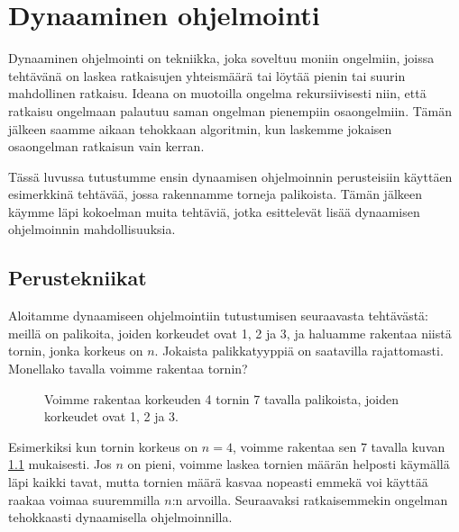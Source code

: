 \chapter{Dynaaminen ohjelmointi}


Dynaaminen ohjelmointi on tekniikka,
joka soveltuu moniin ongelmiin,
joissa tehtävänä on laskea ratkaisujen yhteismäärä
tai löytää pienin tai suurin mahdollinen ratkaisu.
Ideana on muotoilla ongelma rekursiivisesti niin,
että ratkaisu ongelmaan palautuu saman ongelman
pienempiin osaongelmiin.
Tämän jälkeen saamme aikaan tehokkaan algoritmin,
kun laskemme jokaisen osaongelman ratkaisun vain kerran.

Tässä luvussa tutustumme ensin dynaamisen ohjelmoinnin perusteisiin
käyttäen esimerkkinä tehtävää, jossa rakennamme torneja palikoista.
Tämän jälkeen käymme läpi kokoelman muita tehtäviä, jotka esittelevät
lisää dynaamisen ohjelmoinnin mahdollisuuksia.

\section{Perustekniikat}

Aloitamme dynaamiseen ohjelmointiin tutustumisen
seuraavasta tehtävästä:
meillä on palikoita, joiden korkeudet ovat 1, 2 ja 3,
ja haluamme rakentaa niistä tornin, jonka korkeus on $n$.
Jokaista palikkatyyppiä on saatavilla rajattomasti.
Monellako tavalla voimme rakentaa tornin?

\begin{figure}
\center
{}
\caption{Voimme rakentaa korkeuden 4 tornin 7 tavalla palikoista,
joiden korkeudet ovat 1, 2 ja 3.}
\label{fig:dyntor}
\end{figure}

Esimerkiksi kun tornin korkeus on $n=4$, voimme rakentaa
sen 7 tavalla kuvan \ref{fig:dyntor} mukaisesti.
Jos $n$ on pieni, voimme laskea tornien määrän helposti
käymällä läpi kaikki tavat, mutta tornien määrä kasvaa
nopeasti emmekä voi käyttää raakaa voimaa suuremmilla
$n$:n arvoilla.
Seuraavaksi ratkaisemmekin ongelman tehokkaasti
dynaamisella ohjelmoinnilla.

